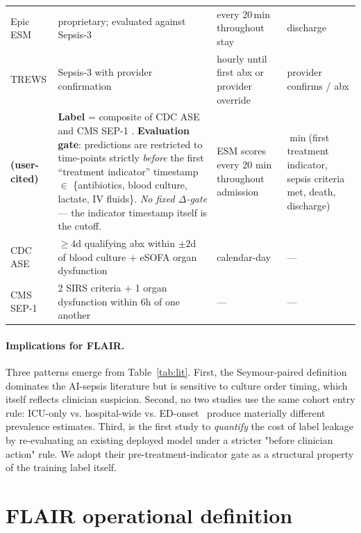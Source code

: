 \documentclass[11pt]{article}
\begin{document}
{\begin{longtable}{p{2.8cm} p{6.4cm} p{2.6cm} p{3.0cm}}
Epic ESM\citep{wong2021external} &
proprietary; evaluated against Sepsis-3 &
every 20\,min throughout stay &
discharge \\

\citet{adams2022trews} TREWS &
Sepsis-3 with provider confirmation &
hourly until first abx or provider override &
provider confirms / abx \\

\textbf{\citet{kamran2024sepsis}} \textbf{(user-cited)} &
\textbf{Label} = composite of CDC ASE \citep{rhee2019sepsis} and
CMS SEP-1 \citep{cms2015sep1}. \textbf{Evaluation gate}: predictions are
restricted to time-points strictly \emph{before} the first ``treatment
indicator'' timestamp $\in$ \{antibiotics, blood culture, lactate, IV
fluids\}. \emph{No fixed $\Delta$-gate} --- the indicator timestamp
itself is the cutoff. &
ESM scores every 20 min throughout admission &
$\min$(first treatment indicator, sepsis criteria met, death, discharge) \\

\citet{rhee2019sepsis} CDC ASE &
$\ge 4$d qualifying abx within $\pm 2$d of blood culture $+$ eSOFA
organ dysfunction &
calendar-day &
--- \\

\citet{cms2015sep1} CMS SEP-1 &
2 SIRS criteria $+$ 1 organ dysfunction within 6h of one another &
--- &
--- \\
\end{longtable}
}

\paragraph{Implications for FLAIR.}
Three patterns emerge from Table~\ref{tab:lit}. First, the
Seymour-paired definition dominates the AI-sepsis literature but is
sensitive to culture order timing, which itself reflects clinician
suspicion. Second, no two studies use the same cohort entry rule:
ICU-only \citep{desautels2016insight, shashikumar2021aise} vs.
hospital-wide \citep{kamran2024sepsis, wong2021external} vs.
ED-onset~\citep{henry2022trews} produce materially different prevalence
estimates. Third, \citet{kamran2024sepsis} is the first study to
\emph{quantify} the cost of label leakage by re-evaluating an existing
deployed model under a stricter "before clinician action" rule. We
adopt their pre-treatment-indicator gate as a structural property of the
training label itself.

\section{FLAIR operational definition}
\label{sec:def}
\end{document}
